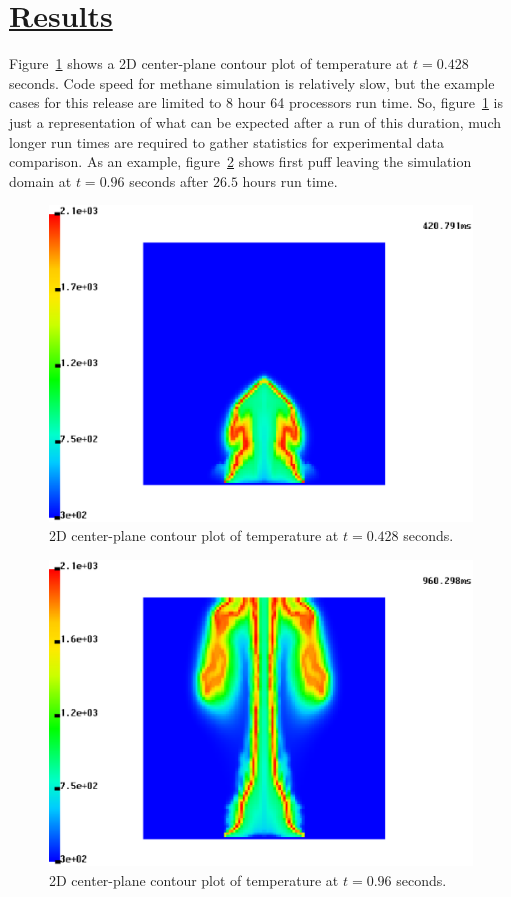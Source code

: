 \documentclass[fleqn]{article}
\begin{document}
\section*{\underline{Results}}
Figure~\ref{results1} shows a 2D center-plane contour plot of temperature at 
$t=0.428$ seconds. Code speed for methane simulation is relatively slow, but
the example cases for this release are limited to 8 hour 64 processors run time. So, figure~\ref{results1} is just a representation of what can be expected
after a run of this duration, much longer run times are required to gather statistics for experimental data comparison. As an example, figure~\ref{results2}
shows first puff leaving the simulation domain at $t=0.96$ seconds after
$26.5$ hours run time.
\begin{figure}
\includegraphics[scale=.85]{figures/methane_1m_420.ps}
\caption{2D center-plane contour plot of temperature at $t=0.428$ seconds.}
\label{results1}
\end{figure}
\begin{figure}
\includegraphics[scale=.85]{figures/methane_1m_960.ps}
\caption{2D center-plane contour plot of temperature at $t=0.96$ seconds.}
\label{results2}
\end{figure}
\newpage


\end{document}
